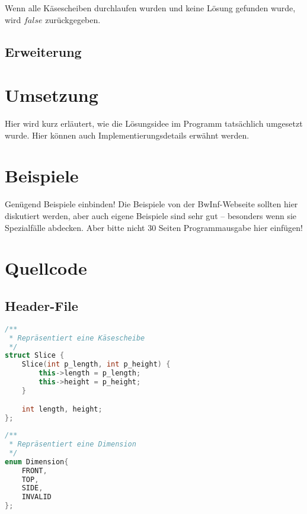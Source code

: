 \documentclass[a4paper,10pt,ngerman]{scrartcl}
\begin{document}
    Wenn alle Käsescheiben durchlaufen wurden und keine Lösung gefunden wurde, wird $false$ zurückgegeben.

    \subsection{Erweiterung}\label{subsec:erweiterung_losungsidee}


    \section{Umsetzung}\label{sec:umsetzung}
    Hier wird kurz erläutert, wie die Lösungsidee im Programm tatsächlich umgesetzt wurde.
    Hier können auch Implementierungsdetails erwähnt werden.


    \section{Beispiele}\label{sec:beispiele}
    Genügend Beispiele einbinden!
    Die Beispiele von der BwInf-Webseite sollten hier diskutiert werden, aber auch eigene Beispiele sind sehr gut – besonders wenn sie Spezialfälle abdecken. Aber bitte nicht 30 Seiten Programmausgabe hier einfügen!

    \newpage


    \section{Quellcode}
    \label{sec:quellcode}
    \label{LastPage}

    \subsection{Header-File}\label{subsec:header-file}

    \begin{lstlisting}[frame=single,language=C++,title=Struct Slice,breaklines=true,label={lst:code_slice}]
/**
 * Repräsentiert eine Käsescheibe
 */
struct Slice {
    Slice(int p_length, int p_height) {
        this->length = p_length;
        this->height = p_height;
    }

    int length, height;
};
    \end{lstlisting}

    \begin{lstlisting}[frame=single,language=C++,title=Enum Dimension,breaklines=true,label={lst:code_dimension}]
/**
 * Repräsentiert eine Dimension
 */
enum Dimension{
    FRONT,
    TOP,
    SIDE,
    INVALID
};
    \end{lstlisting}
\end{document}
